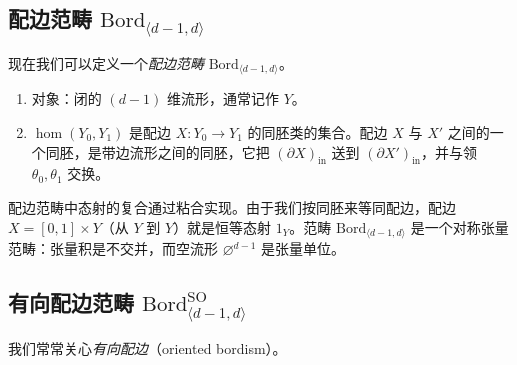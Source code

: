 
\subsection{配边范畴 $\mathrm{Bord}_{\langle d-1,d\rangle}$} %

现在我们可以定义一个\emph{配边范畴} $\mathrm{Bord}_{\langle d-1,d\rangle}$。
\begin{enumerate}
  \item 对象：闭的 $(d-1)$ 维流形，通常记作 $Y$。
  \item $\hom(Y_0,Y_1)$ 是配边 $X:Y_0\to Y_1$ 的同胚类的集合。配边 $X$ 与 $X'$ 之间的一个同胚，是带边流形之间的同胚，它把 $(\partial X)_{\mathrm{in}}$ 送到 $(\partial X')_{\mathrm{in}}$，并与领 $\theta_0,\theta_1$ 交换。
\end{enumerate}

配边范畴中态射的复合通过粘合实现。由于我们按同胚来等同配边，配边 $X=[0,1]\times Y$（从 $Y$ 到 $Y$）就是恒等态射 $1_Y$。范畴 $\mathrm{Bord}_{\langle d-1,d\rangle}$ 是一个对称张量范畴：张量积是不交并，而空流形 $\varnothing^{d-1}$ 是张量单位。


\subsection{有向配边范畴 $\mathrm{Bord}^{\mathrm{SO}}_{\langle d-1,d\rangle}$} %

我们常常关心\emph{有向配边}（oriented bordism）。

